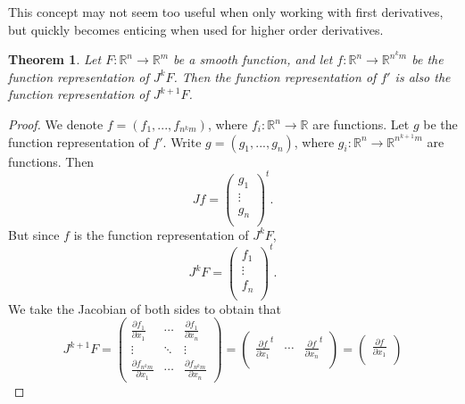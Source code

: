 \documentclass{article}
\theoremstyle{plain} %
\newtheorem{thm}{Theorem}
\numberwithin{thm}{section} %
\theoremstyle{definition}
\begin{document}
    
    This concept may not seem too useful when only working with first derivatives, but quickly becomes enticing when used for higher order derivatives.
    \begin{thm}
        Let \(F: \mathbb{R}^n \to \mathbb{R}^m\) be a smooth function, and let \(f: \mathbb{R}^n \to \mathbb{R}^{n^k m}\) be the function representation of \(J^k F\). Then the function representation of \(f'\) is also the function representation of \(J^{k+1} F\).
    \end{thm}
    \begin{proof}
        We denote \(f = (f_1, ..., f_{n^k m})\), where \(f_i : \mathbb{R}^n \to \mathbb{R}\) are functions. Let \(g\) be the function representation of \(f'\). Write \(g = (g_1, ..., g_n)\), where \(g_i : \mathbb{R}^n \to \mathbb{R}^{n^{k+1}m}\) are functions. Then
        \[
            Jf = \begin{pmatrix}
                 g_1 \\
                 \vdots \\
                 g_n \\
            \end{pmatrix}^t.
        \]
        But since \(f\) is the function representation of \(J^k F\),
        \[
            J^k F = \begin{pmatrix}
                 f_1 \\
                 \vdots \\
                 f_n \\
            \end{pmatrix}^t.
        \]
        We take the Jacobian of both sides to obtain that
        \[
            J^{k+1} F = \begin{pmatrix}
                \frac{\partial f_{1}}{\partial x_1} & \cdots & \frac{\partial f_{1}}{\partial x_n} \\
                \vdots & \ddots & \vdots \\
                \frac{\partial f_{n^{k}m}}{\partial x_1} & \cdots & \frac{\partial f_{n^k m}}{\partial x_n}
            \end{pmatrix}
            =
            \begin{pmatrix}
                \frac{\partial f}{\partial x_1}^t & \cdots &  \frac{\partial f}{\partial x_n}^t \\
            \end{pmatrix}
            = 
            \begin{pmatrix}
                \frac{\partial f}{\partial x_1} \\

\end{pmatrix}\]
\end{proof}
\end{document}
